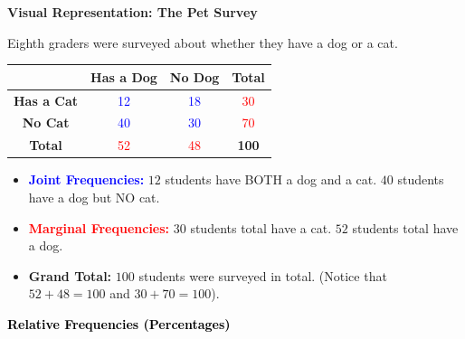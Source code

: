 \documentclass[12pt, letterpaper, fleqn]{article}
\begin{document}
\begin{tcolorbox}[colback=white, colframe=black!25, boxrule=0.6pt, arc=4mm, left=6mm, right=6mm, top=5mm, bottom=5mm]

\textbf{Visual Representation: The Pet Survey}

\medskip

Eighth graders were surveyed about whether they have a dog or a cat. 

\begin{center}
\renewcommand{\arraystretch}{1.5}
\begin{tabular}{|c|c|c|c|}
\hline
 & \textbf{Has a Dog} & \textbf{No Dog} & \textbf{Total} \\
\hline
\textbf{Has a Cat} & \textcolor{blue}{12} & \textcolor{blue}{18} & \textcolor{red}{30} \\
\hline
\textbf{No Cat} & \textcolor{blue}{40} & \textcolor{blue}{30} & \textcolor{red}{70} \\
\hline
\textbf{Total} & \textcolor{red}{52} & \textcolor{red}{48} & \textcolor{green!50!black}{\textbf{100}} \\
\hline
\end{tabular}
\end{center}

\medskip
\begin{itemize}
    \item \textcolor{blue}{\textbf{Joint Frequencies:}} $12$ students have BOTH a dog and a cat. $40$ students have a dog but NO cat.
    \item \textcolor{red}{\textbf{Marginal Frequencies:}} $30$ students total have a cat. $52$ students total have a dog.
    \item \textcolor{green!50!black}{\textbf{Grand Total:}} $100$ students were surveyed in total. (Notice that $52+48=100$ and $30+70=100$).
\end{itemize}

\end{tcolorbox}

\vspace{4mm}

\newpage

\begin{tcolorbox}[colback=customteal!20]
\large\textcolor{black}{\textbf{Relative Frequencies (Percentages)}}
\end{tcolorbox}
\end{document}
